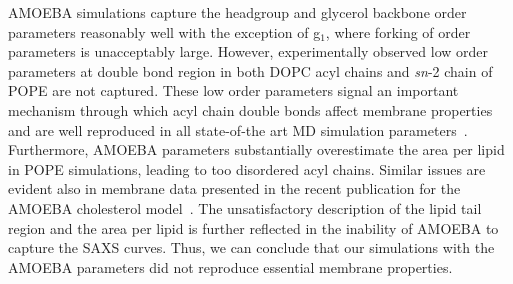 \documentclass[journal=jacsat,manuscript=article,layout=singlecolumn]{achemso}
\begin{document}
 AMOEBA simulations capture the headgroup and glycerol backbone order parameters reasonably well with the exception of g$_1$,
where forking of order parameters is unacceptably large. However, experimentally observed low order parameters at double bond region in both DOPC acyl chains and {\it sn}-2 chain of POPE are not captured. These low order parameters signal an important mechanism through which acyl chain double bonds affect membrane properties~\cite{ollila07} and are well reproduced in all state-of-the art MD simulation parameters~\cite{ollila16}. Furthermore, AMOEBA parameters substantially overestimate the area per lipid in POPE simulations, leading to too disordered acyl chains. Similar issues are evident also in membrane data presented in the recent publication for the AMOEBA cholesterol model~\cite{Li23chol}.
%
%
The unsatisfactory description of the lipid tail region and the area per lipid is further reflected in the inability of AMOEBA to capture the SAXS curves. Thus, we can conclude that our simulations with the AMOEBA parameters did not reproduce essential
membrane properties. 
\end{document}
